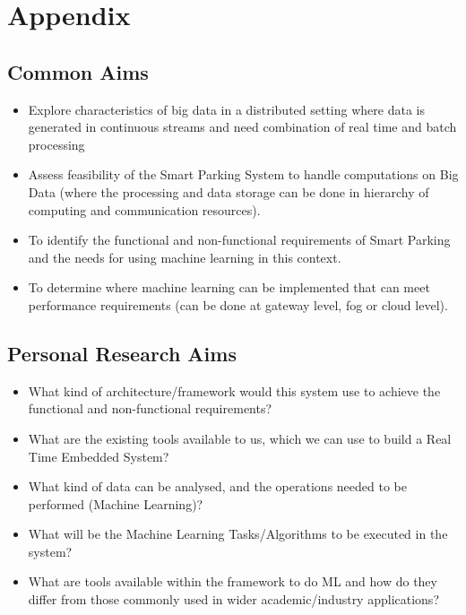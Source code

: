 
\section{Appendix}

\subsection{Common Aims}
    \begin{itemize}
      \item Explore characteristics of big data in a distributed setting where data is generated in continuous streams and need combination of real time and batch processing 
    
      \item Assess feasibility of the Smart Parking System to handle computations on Big Data (where the processing and data storage can be done in hierarchy of computing and communication resources). 
    
      \item To identify the functional and non-functional requirements of Smart Parking and the needs for using machine learning in this context. 
    
      \item To determine where machine learning can be implemented that can meet performance requirements (can be done at gateway level, fog or cloud level). 
    \end{itemize}


\subsection{Personal Research Aims}
    \begin{itemize}
        \item What kind of architecture/framework would this system use to achieve the functional and non-functional requirements?  
        
        \item What are the existing tools available to us, which we can use to build a Real Time Embedded System?
        
        \item What kind of data can be analysed, and the operations needed to be performed (Machine Learning)? 
        
        \item What will be the Machine Learning Tasks/Algorithms to be executed in the system? 
        
        \item What are tools available within the framework to do ML and how do they differ from those commonly used in wider academic/industry applications? 
    \end{itemize}
